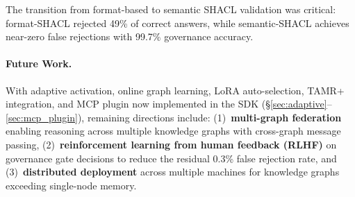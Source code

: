 \documentclass[a4paper,11pt]{article}
\theoremstyle{definition}
\begin{document}
The transition from format-based to semantic SHACL validation was critical: format-SHACL rejected 49\% of correct answers, while semantic-SHACL achieves near-zero false rejections with 99.7\% governance accuracy.

\paragraph{Future Work.}
With adaptive activation, online graph learning, LoRA auto-selection, TAMR+ integration, and MCP plugin now implemented in the SDK (\S\ref{sec:adaptive}--\ref{sec:mcp_plugin}), remaining directions include:
(1)~\textbf{multi-graph federation} enabling reasoning across multiple knowledge graphs with cross-graph message passing,
(2)~\textbf{reinforcement learning from human feedback (RLHF)} on governance gate decisions to reduce the residual 0.3\% false rejection rate,
and (3)~\textbf{distributed deployment} across multiple machines for knowledge graphs exceeding single-node memory.

\end{document}
